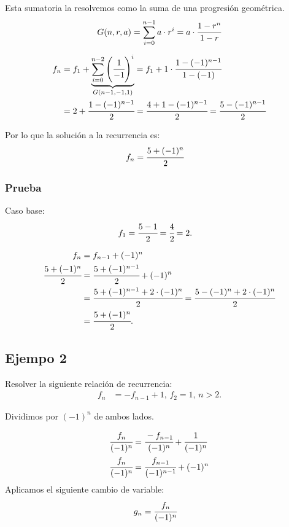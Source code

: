 Esta sumatoria la resolvemos como la suma de una progresión geométrica.
\begin{align}
\label{eq:sum-geom}
G(n, r, a) = \sum_{i=0}^{n-1}{a\cdot r^i}=a\cdot\cfrac{1-r^n}{1-r}
\end{align}

\begin{align*}
f_n&=f_1+\underset{G(n-1,-1,1)}{\underbrace{\sum_{i=0}^{n-2}{\left(\cfrac{1}{-1}\right)^i}}}=f_1+1\cdot \cfrac{1-(-1)^{n-1}}{1-(-1)}\\
&=2+\cfrac{1-(-1)^{n-1}}{2}=\cfrac{4+1-(-1)^{n-1}}{2}=\cfrac{5-(-1)^{n-1}}{2}
\end{align*}

Por lo que la solución a la recurrencia es:
\begin{align*}
f_n&=\cfrac{5+(-1)^n}{2}
\end{align*}

\subsubsection{Prueba}
Caso base:
\begin{align*}
f_1&=\cfrac{5-1}{2}=\cfrac{4}{2}=2.
\end{align*}

\begin{align*}
f_n&=f_{n-1}+(-1)^n\\
\cfrac{5+(-1)^n}{2}&=\cfrac{5+(-1)^{n-1}}{2}+(-1)^n\\
&=\cfrac{5+(-1)^{n-1}+2\cdot (-1)^n}{2}=\cfrac{5-(-1)^{n}+2\cdot (-1)^n}{2}\\
&=\cfrac{5+(-1)^n}{2}.
\end{align*}

\subsection{Ejempo 2}
Resolver la siguiente relación de recurrencia:
\begin{align*}
f_n&=-f_{n-1}+1,\,f_2=1,\,n>2.
\end{align*}

Dividimos por $(-1)^n$ de ambos lados.

\begin{align*}
\cfrac{f_n}{(-1)^n}&=\cfrac{-f_{n-1}}{(-1)^n}+\cfrac{1}{(-1)^n}\\
\cfrac{f_n}{(-1)^n}&=\cfrac{f_{n-1}}{(-1)^{n-1}}+(-1)^n\\
\end{align*}
Aplicamos el siguiente cambio de variable:
\begin{align*}
g_n&=\cfrac{f_n}{(-1)^n}
\end{align*}

